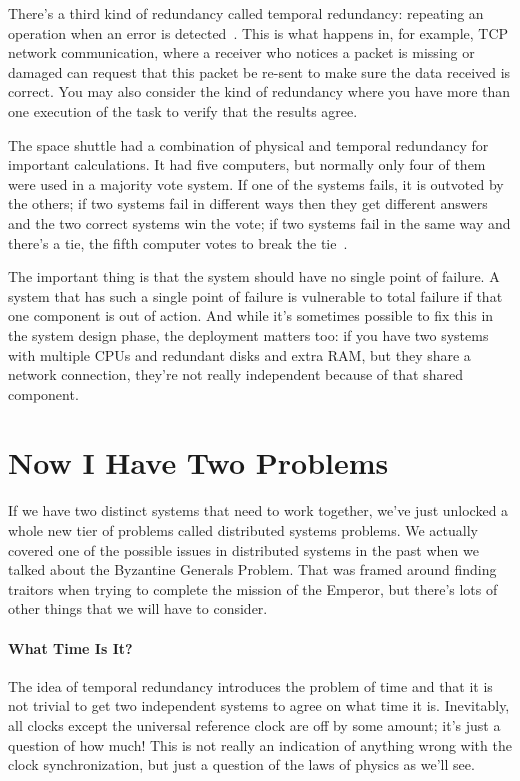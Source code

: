 There's a third kind of redundancy called temporal redundancy: repeating an operation when an error is detected~\cite{osi}. This is what happens in, for example, TCP network communication, where a receiver who notices a packet is missing or damaged can request that this packet be re-sent to make sure the data received is correct. You may also consider the kind of redundancy where you have more than one execution of the task to verify that the results agree.

The space shuttle had a combination of physical and temporal redundancy for important calculations. It had five computers, but normally only four of them were used in a majority vote system. If one of the systems fails, it is outvoted by the others; if two systems fail in different ways then they get different answers and the two correct systems win the vote; if two systems fail in the same way and there's a tie, the fifth computer votes to break the tie~\cite{mte241}.


The important thing is that the system should have no single point of failure. A system that has such a single point of failure is vulnerable to total failure if that one component is out of action. And while it's sometimes possible to fix this in the system design phase, the deployment matters too: if you have two systems with multiple CPUs and redundant disks and extra RAM, but they share a network connection, they're not really independent because of that shared component.

\section*{Now I Have Two Problems}
If we have two distinct systems that need to work together, we've just unlocked a whole new tier of problems called distributed systems problems. We actually covered one of the possible issues in distributed systems in the past when we talked about the Byzantine Generals Problem. That was framed around finding traitors when trying to complete the mission of the Emperor, but there's lots of other things that we will have to consider.

\paragraph{What Time Is It?}
The idea of temporal redundancy introduces the problem of time and that it is not trivial to get two independent systems to agree on what time it is. Inevitably, all clocks except the universal reference clock are off by some amount; it's just a question of how much! This is not really an indication of anything wrong with the clock synchronization, but just a question of the laws of physics as we'll see.

